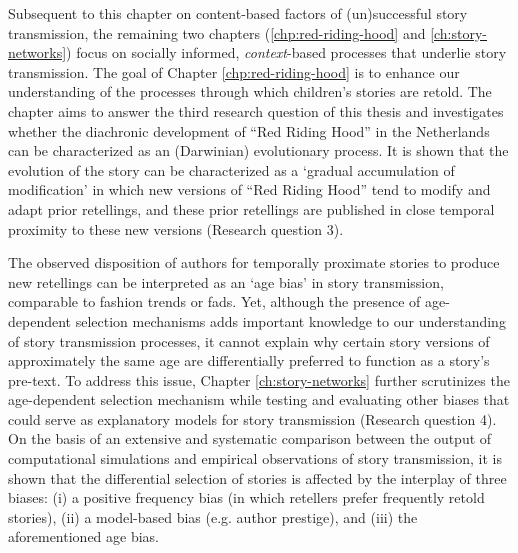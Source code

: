 Subsequent to this chapter on content-based factors of (un)successful story transmission, the remaining two chapters (\ref{chp:red-riding-hood} and \ref{ch:story-networks}) focus on socially informed, \emph{context}-based processes that underlie story transmission. The goal of Chapter \ref{chp:red-riding-hood} is to enhance our understanding of the processes through which children's stories are retold. The chapter aims to answer the third research question of this thesis and investigates whether the diachronic development of ``Red Riding Hood'' in the Netherlands can be characterized as an (Darwinian) evolutionary process. It is shown that the evolution of the story can be characterized as a `gradual accumulation of modification' in which new versions of ``Red Riding Hood'' tend to modify and adapt prior retellings, and these prior retellings are published in close temporal proximity to these new versions (Research question 3). 

The observed disposition of authors for temporally proximate stories to produce new retellings can be interpreted as an `age bias' in story transmission, comparable to fashion trends or fads. Yet, although the presence of age-dependent selection mechanisms adds important knowledge to our understanding of story transmission processes, it cannot explain why certain story versions of approximately the same age are differentially preferred to function as a story's pre-text. To address this issue, Chapter \ref{ch:story-networks} further scrutinizes the age-dependent selection mechanism while testing and evaluating other biases that could serve as explanatory models for story transmission (Research question 4). On the basis of an extensive and systematic comparison between the output of computational simulations and empirical observations of story transmission, it is shown that the differential selection of stories is affected by the interplay of three biases: (i) a positive frequency bias (in which retellers prefer frequently retold stories), (ii) a model-based bias (e.g. author prestige), and (iii) the aforementioned age bias. 

